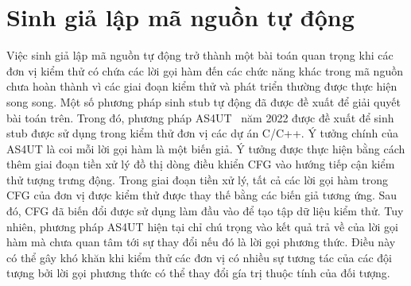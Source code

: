 \section{Sinh giả lập mã nguồn tự động} \label{sec:autostub-Lam}
Việc sinh giả lập mã nguồn tự động trở thành một bài toán quan trọng khi các đơn vị kiểm thử có chứa các lời gọi hàm đến các chức năng khác trong mã nguồn chưa hoàn thành vì các giai đoạn kiểm thử và phát triển thường được thực hiện song song. Một số phương pháp sinh stub tự động đã được đề xuất để giải quyết bài toán trên. Trong đó, phương pháp AS4UT~\cite{TUNG2022106821} năm 2022 được đề xuất để sinh stub được sử dụng trong kiểm thử đơn vị các dự án C/C++. Ý tưởng chính của AS4UT là coi mỗi lời gọi hàm là một biến giả. Ý tưởng được thực hiện bằng cách thêm giai đoạn tiền xử lý đồ thị dòng điều khiển CFG vào hướng tiếp cận kiểm thử tượng trưng động. Trong giai đoạn tiền xử lý, tất cả các lời gọi hàm trong CFG của đơn vị được kiểm thử được thay thế bằng các biến giả tương ứng. Sau đó, CFG đã biến đổi được sử dụng làm đầu vào để tạo tập dữ liệu kiểm thử. Tuy nhiên, phương pháp AS4UT hiện tại chỉ chú trọng vào kết quả trả về của lời gọi hàm mà chưa quan tâm tới sự thay đổi nếu đó là lời gọi phương thức. Điều này có thể gây khó khăn khi kiểm thử các đơn vị có nhiều sự tương tác của các đội tượng bởi lời gọi phương thức có thể thay đổi gía trị thuộc tính của đối tượng.